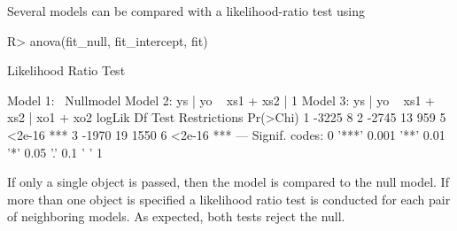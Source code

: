 \documentclass[%
    twoside, openright, titlepage, numbers=noenddot,%
    cleardoublepage=empty,%
    abstract=false,%
    BCOR=5.5mm, paper=a5, fontsize=10pt,%
]{scrreprt}
\begin{document}
Several models can be compared with a likelihood-ratio test using
%
\begin{Schunk}
\begin{Sinput}
R> anova(fit_null, fit_intercept, fit)
\end{Sinput}
\begin{Soutput}
Likelihood Ratio Test

Model 1: ~Nullmodel
Model 2: ys | yo ~ xs1 + xs2 | 1
Model 3: ys | yo ~ xs1 + xs2 | xo1 + xo2
  logLik    Df  Test Restrictions Pr(>Chi)    
1  -3225     8                                
2  -2745    13   959            5   <2e-16 ***
3  -1970    19  1550            6   <2e-16 ***
---
Signif. codes:  0 '***' 0.001 '**' 0.01 '*' 0.05 '.' 0.1 ' ' 1
\end{Soutput}
\end{Schunk}
%
If only a single object is passed, then the model is compared to the null model. If more than one object is specified a likelihood ratio test is conducted for each pair of neighboring models. As expected, both tests reject the null.
\end{document}

